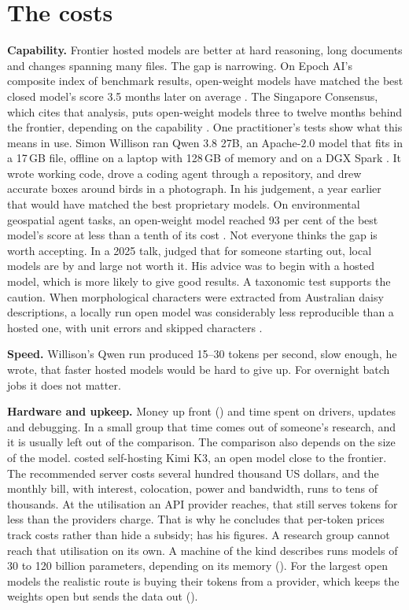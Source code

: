 \section{The costs}

\textbf{Capability.} Frontier hosted models are better at hard reasoning, long
documents and changes spanning many files. The gap is narrowing. On Epoch AI's
composite index of benchmark results, open-weight models have matched the best
closed model's score 3.5 months later on average
\parencite{emberson2025openweightlag}. The Singapore Consensus, which cites
that analysis, puts open-weight models three to twelve months behind the
frontier, depending on the capability \parencite{casper2026singapore}. One
practitioner's tests show what this means in use. Simon Willison ran Qwen 3.8
27B, an Apache-2.0 model that fits in a 17\,GB file, offline on a laptop with
128\,GB of memory and on a DGX Spark \parencite{willison2026qwen38}. It wrote
working code, drove a coding agent through a repository, and drew accurate
boxes around birds in a photograph. In his judgement, a year earlier that
would have matched the best proprietary models.
On environmental geospatial agent tasks, an open-weight model reached 93 per
cent of the best model's score at less than a tenth of its cost
\parencite{diazireland2026geonature}.
Not everyone thinks the gap is worth accepting. In a 2025 talk,
\textcite{wickham2026nobs} judged that for someone starting out, local models are
by and large not worth it. His advice was to begin with a hosted model, which is
more likely to give good results. A taxonomic test supports the caution. When
morphological characters were extracted from Australian daisy descriptions, a
locally run open model was considerably less reproducible than a hosted one, with
unit errors and skipped characters \parencite{schmidtlebuhn2025morphology}.

\textbf{Speed.} Willison's Qwen run produced 15--30 tokens per second, slow
enough, he wrote, that faster hosted models would be hard to give up. For
overnight batch jobs it does not matter.

\textbf{Hardware and upkeep.} Money up front () and time
spent on drivers, updates and debugging. In a small group that time comes out of
someone's research, and it is usually left out of the comparison.
The comparison also depends on the size of the model.
\textcite{wickham2026tokencost} costed self-hosting Kimi K3, an open model
close to the frontier. The recommended server costs several hundred thousand
US dollars, and the monthly bill, with interest, colocation, power and
bandwidth, runs to tens of thousands. At the utilisation an API provider
reaches, that still serves tokens for less than the providers charge. That
is why he concludes that per-token prices track costs rather than hide a
subsidy;  has his figures. A research group cannot
reach that utilisation on its own. A machine of the kind 
describes runs models of 30 to 120 billion parameters, depending on its
memory (). For the largest open models the realistic
route is buying their tokens from a provider, which keeps the weights open
but sends the data out ().

